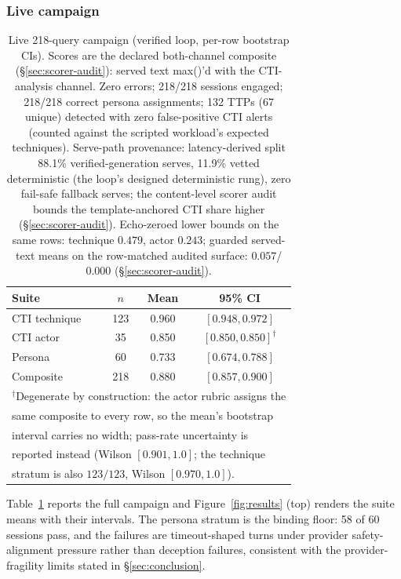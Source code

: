 \subsubsection{Live campaign}
\begin{table}[t]
\centering
\caption{Live 218-query campaign (verified loop, per-row bootstrap CIs).
Scores are the declared both-channel composite (\S\ref{sec:scorer-audit}):
served text max()'d with the CTI-analysis channel. Zero errors;
218/218 sessions engaged; 218/218 correct persona assignments; 132 TTPs
(67 unique) detected with zero false-positive CTI alerts (counted
against the scripted workload's expected techniques). Serve-path
provenance: latency-derived split 88.1\% verified-generation serves,
11.9\% vetted deterministic (the loop's designed deterministic rung),
zero fail-safe fallback serves; the content-level scorer audit bounds
the template-anchored CTI share higher (\S\ref{sec:scorer-audit}). Echo-zeroed lower bounds on the same rows: technique
$0.479$, actor $0.243$; guarded served-text means on the row-matched
audited surface: $0.057$/$0.000$ (\S\ref{sec:scorer-audit}).}
\label{tab:live}
\begin{tabular}{lccc}
\toprule
Suite & $n$ & Mean & 95\% CI \\
\midrule
CTI technique & 123 & 0.960 & $[0.948, 0.972]$ \\
CTI actor     & 35  & 0.850 & $[0.850, 0.850]^\dagger$ \\
Persona       & 60  & 0.733 & $[0.674, 0.788]$ \\
\midrule
Composite     & 218 & 0.880 & $[0.857, 0.900]$ \\
\bottomrule
\multicolumn{4}{l}{\footnotesize $^\dagger$Degenerate by construction: the actor rubric assigns the} \\
\multicolumn{4}{l}{\footnotesize same composite to every row, so the mean's bootstrap} \\
\multicolumn{4}{l}{\footnotesize interval carries no width; pass-rate uncertainty is} \\
\multicolumn{4}{l}{\footnotesize reported instead (Wilson $[0.901, 1.0]$; the technique} \\
\multicolumn{4}{l}{\footnotesize stratum is also $123/123$, Wilson $[0.970, 1.0]$).} \\
\end{tabular}
\end{table}
Table~\ref{tab:live} reports the full campaign and
Figure~\ref{fig:results} (top) renders the suite means with their
intervals. The persona stratum is
the binding floor: 58 of 60 sessions pass, and the failures are
timeout-shaped turns under provider safety-alignment pressure rather
than deception failures, consistent with the provider-fragility
limits stated in \S\ref{sec:conclusion}.

